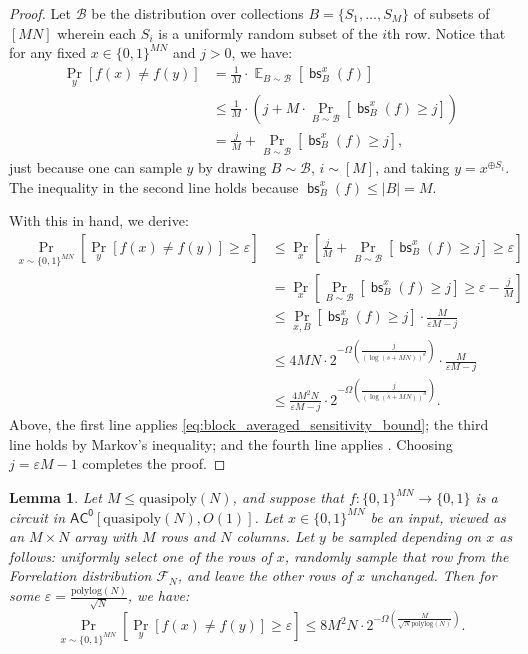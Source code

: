 \documentclass[11pt]{article}%
\newtheorem{lemma}[theorem]{Lemma}
\newcommand{\eps}{\varepsilon}
\newcommand{\E}{\mathop{\mathbb{E}}}
\newcommand{\polylog}{\mathrm{polylog}}
\newcommand{\quasipoly}{\mathrm{quasipoly}}
\DeclareMathOperator{\bs}{\mathsf{bs}}
\begin{document}
\begin{proof}
Let $\mathcal{B}$ be the distribution over collections $B = \{S_1,\ldots,S_M\}$ of subsets of $[MN]$ wherein each $S_i$ is a uniformly random subset of the $i$th row. Notice that for any fixed $x \in \{0,1\}^{MN}$ and $j > 0$, we have:
\begin{align}
\Pr_y\left[f(x) \neq f(y)\right]
&= \frac{1}{M} \cdot \E_{B \sim \mathcal{B}}\left[\bs^x_B(f)\right]\nonumber\\
&\le \frac{1}{M} \cdot \left(j + M \cdot \Pr_{B \sim \mathcal{B}}\left[\bs^x_B(f) \ge j\right] \right)\nonumber\\
&= \frac{j}{M} + \Pr_{B \sim \mathcal{B}}\left[\bs^x_B(f) \ge j\right],\label{eq:block_averaged_sensitivity_bound}
\end{align}
just because one can sample $y$ by drawing $B \sim \mathcal{B}$, $i \sim [M]$, and taking $y = x^{\oplus S_i}$. The inequality in the second line holds because $\bs^x_B(f) \le |B| = M$.

With this in hand, we derive:
\begin{align*}
\Pr_{x \sim \{0,1\}^{MN}}\left[\Pr_y\left[f(x) \neq f(y)\right] \ge \eps \right]
&\le \Pr_{x}\left[\frac{j}{M} + \Pr_{B \sim \mathcal{B}}\left[\bs^x_B(f) \ge j\right] \ge \eps \right]\\
&= \Pr_{x}\left[\Pr_{B \sim \mathcal{B}}\left[\bs^x_B(f) \ge j\right] \ge \eps - \frac{j}{M} \right]\\
&\le \Pr_{x,B}\left[\bs^x_B(f) \ge j\right] \cdot \frac{M}{\eps M - j}\\
&\le 4MN \cdot 2^{-\Omega\left(\frac{j}{(\log(s + MN))^d}\right)} \cdot \frac{M}{\eps M - j}\\
&\le \frac{4M^2N}{\eps M - j} \cdot 2^{-\Omega\left(\frac{j}{(\log(s + MN))^d}\right)}.
\end{align*}
Above, the first line applies \eqref{eq:block_averaged_sensitivity_bound}; the third line holds by Markov's inequality; and the fourth line applies . Choosing $j = \eps M - 1$ completes the proof.
\end{proof}

\begin{lemma}
\label{lem:ac0_single_forrelated_block_indistinguishable}
Let $M \le \quasipoly(N)$, and suppose that $f: \{0,1\}^{MN} \to \{0,1\}$ is a circuit in $\mathsf{AC^0}[\quasipoly(N), O(1)]$. Let $x \in \{0,1\}^{MN}$ be an input, viewed as an $M \times N$ array with $M$ rows and $N$ columns. Let $y$ be sampled depending on $x$ as follows: uniformly select one of the rows of $x$, randomly sample that row from the Forrelation distribution $\mathcal{F}_N$, and leave the other rows of $x$ unchanged. Then for some $\eps = \frac{\polylog(N)}{\sqrt{N}}$, we have:
\[
\Pr_{x \sim \{0,1\}^{MN}}\left[\Pr_y\left[f(x) \neq f(y)\right] \ge \eps \right] \le 8M^2N \cdot 2^{-\Omega\left(\frac{M}{\sqrt{N} \polylog(N)}\right)}.
\]

\end{lemma}
\end{document}
